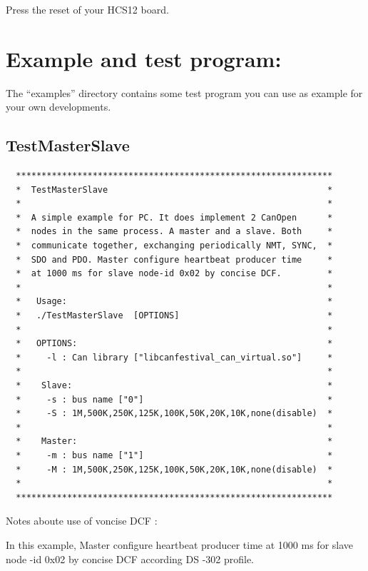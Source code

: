 \documentclass[12pt,english,a4paper]{book}
\begin{document}
Press the reset of your HCS12 board.


\section{Example and test program:}

The {}``examples'' directory contains some test program you can
use as example for your own developments.


\subsection{TestMasterSlave}


\begin{verbatim}
  **************************************************************
  *  TestMasterSlave                                           *
  *                                                            *
  *  A simple example for PC. It does implement 2 CanOpen      *
  *  nodes in the same process. A master and a slave. Both     *
  *  communicate together, exchanging periodically NMT, SYNC,  *
  *  SDO and PDO. Master configure heartbeat producer time     *
  *  at 1000 ms for slave node-id 0x02 by concise DCF.         *                                  
  *                                                            *
  *   Usage:                                                   *
  *   ./TestMasterSlave  [OPTIONS]                             *
  *                                                            *
  *   OPTIONS:                                                 *
  *     -l : Can library ["libcanfestival_can_virtual.so"]     *
  *                                                            *
  *    Slave:                                                  *
  *     -s : bus name ["0"]                                    *
  *     -S : 1M,500K,250K,125K,100K,50K,20K,10K,none(disable)  *
  *                                                            *
  *    Master:                                                 *
  *     -m : bus name ["1"]                                    *
  *     -M : 1M,500K,250K,125K,100K,50K,20K,10K,none(disable)  *
  *                                                            *
  **************************************************************
\end{verbatim}


Notes aboute use of voncise DCF :

In this example, Master configure heartbeat producer time
at 1000 ms for slave node -id 0x02 by concise DCF according DS -302
profile.
\end{document}
